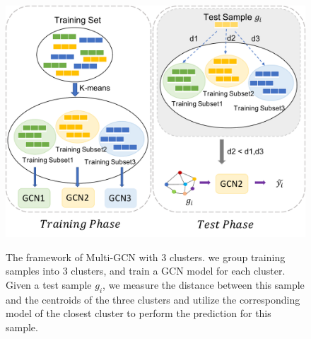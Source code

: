 \documentclass[11pt,dvipdfm]{article}
\begin{document}
\begin{figure}[!t]

\begin{center}

{\includegraphics[width=0.7\linewidth]{submissions/Yiqi2023/figs/mmodel.pdf}}

\end{center}
\caption{The framework of Multi-GCN with $3$ clusters. we group training samples into $3$ clusters, and train a GCN model for each cluster. Given a test sample $g_i$, we measure the distance between this sample and the centroids of the three clusters and utilize the corresponding model of the closest cluster to perform the prediction for this sample. }

\label{fig:yiqi_mmodel-frame}
\end{figure}
\end{document}
